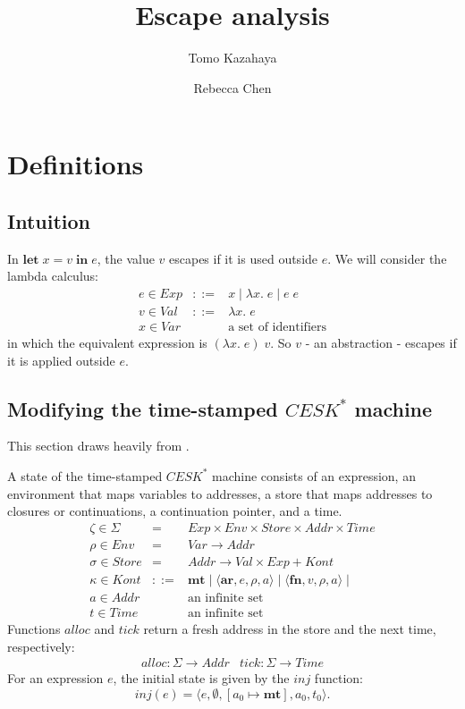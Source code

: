 \RequirePackage[hyphens]{url}\documentclass[12pt,oneside]{amsart}
\title{Escape analysis}
\author{Tomo Kazahaya \and Rebecca Chen}
\newcommand{\kw}[1]{\mathbf{#1}}
\newcommand{\lmd}[2]{\lambda #1.\;#2}
\begin{document}
\maketitle

\section{Definitions}

\subsection{Intuition}

In $\kw{let}\;x = v\;\kw{in}\;e$, the value $v$ escapes if it is used outside $e$.  We will consider the lambda calculus:
\[\begin{array}{lll}
    e \in Exp & ::= & x \mid \lmd{x}{e} \mid e\;e \\
    v \in Val & ::= & \lmd{x}{e} \\
    x \in Var & & \text{a set of identifiers}
\end{array}\]
in which the equivalent expression is $(\lmd{x}{e})\; v$.  So $v$ - an abstraction - escapes if it is applied outside $e$.

\subsection{Modifying the time-stamped $CESK^\ast$ machine}

This section draws heavily from \cite{CS152, HM}.

A state of the time-stamped $CESK^\ast$ machine consists of an expression, an environment that maps variables to addresses, a store that maps addresses to closures or continuations, a continuation pointer, and a time.
\[\begin{array}{lll}
    \zeta \in \Sigma & = & Exp \times Env \times Store \times Addr \times Time \\
    \rho \in Env & = & Var \rightarrow Addr \\
    \sigma \in Store & = & Addr \rightarrow Val \times Exp + Kont \\
    \kappa \in Kont & ::= & \kw{mt} \mid \langle\kw{ar}, e, \rho, a\rangle
        \mid \langle\kw{fn}, v, \rho, a\rangle \mid \\
    a \in Addr & & \text{an infinite set} \\
    t \in Time & & \text{an infinite set}
\end{array}\]
Functions $alloc$ and $tick$ return a fresh address in the store and the next time, respectively:
\[\begin{array}{cc}
    alloc : \Sigma \rightarrow Addr & tick : \Sigma \rightarrow Time
\end{array}\]
For an expression $e$, the initial state is given by the $inj$ function:
\[inj(e) =
    \langle e, \emptyset, [a_0\mapsto\kw{mt}], a_0, t_0\rangle.\]
\end{document}
